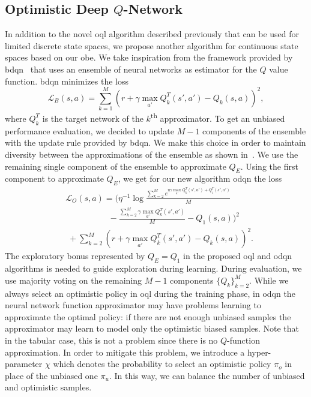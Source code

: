 \subsection{Optimistic Deep $Q$-Network}\label{sec:proposedalg}
In addition to the novel \gls{oql} algorithm described previously that can be used for limited discrete state spaces, we
propose another algorithm for continuous state spaces based on our \gls{obe}. We take inspiration from the framework provided by \gls{bdqn}~\cite{osband2017deep}
that uses an ensemble of neural networks as estimator for the $Q$ value function.
\gls{bdqn} minimizes the loss
\begin{equation}
	\mathcal{L}_B(s,a)\! = \! \sum_{k=1}^M (r + \gamma \max_{a'}Q_k^T(s',a') - Q_k(s,a))^2, \nonumber
\end{equation}
where $Q_k^T$ is the target network of the $k$\textsuperscript{th} approximator. 
To get an unbiased performance evaluation, we decided to update $M-1$ components of the ensemble with the update rule provided by \gls{bdqn}. We make this choice in order to maintain diversity between the approximations of the ensemble as shown in~\cite{osband2016deep}. We use the remaining single component of the ensemble to approximate $Q_E$. Using the first component to approximate $Q_E$, we get for our new algorithm \gls{odqn} the loss
\begin{eqnarray}
	&\mathcal{L}_O(s,a) = (\eta^{-1}\log \frac{\sum_{k=2}^M
	 e^{\eta\gamma\max_{a'}Q_k^T(s',a')+ Q_1^T(s',a')}}{M}\nonumber \\
&\qquad\qquad\;\;\;\;  -  \frac{\sum_{k=2}^M  \gamma\max_{a'}Q^T_k(s',a')}{M} -Q_1(s,a))^2\nonumber \\
&\;  + \sum_{k=2}^M (r + \gamma\max_{a'}Q^T_k(s',a') -
	 Q_k(s,a))^2.  \label{optimisticloss}
\end{eqnarray}
The exploratory bonus represented by $Q_E = Q_1$ in the proposed \gls{oql} and \gls{odqn} algorithms is needed to
guide exploration during learning. During evaluation, we use majority voting on the remaining $M-1$
components $\{Q_k\}_{k=2}^M$. While we always select an optimistic policy in \gls{oql} during the training phase, in
\gls{odqn} the neural network function approximator may have problems learning to approximate the optimal
policy: if there are not enough unbiased samples the approximator may learn to model only the optimistic
biased samples. Note that in the tabular case, this is not a problem since there is no $Q$-function
approximation. In order to mitigate this problem, we introduce a hyper-parameter $\chi$ which denotes the probability to select an optimistic policy $\pi_o$ in place of the unbiased one $\pi_u$. In this way, we can balance the number of unbiased and optimistic samples.
